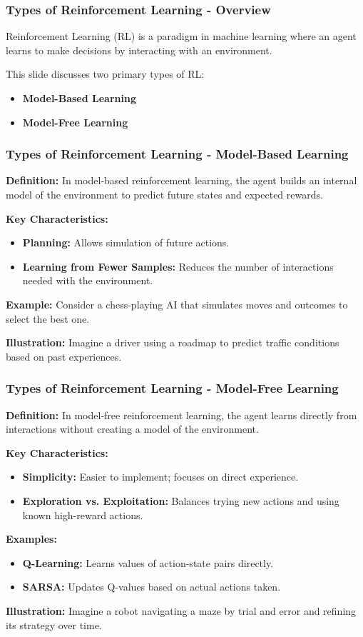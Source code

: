 \documentclass[aspectratio=169]{beamer}
\begin{document}
\begin{frame}[fragile]
  \frametitle{Types of Reinforcement Learning - Overview}
  Reinforcement Learning (RL) is a paradigm in machine learning where an agent learns to make decisions by interacting with an environment.
  
  This slide discusses two primary types of RL:
  \begin{itemize}
      \item \textbf{Model-Based Learning}
      \item \textbf{Model-Free Learning}
  \end{itemize}
\end{frame}

\begin{frame}[fragile]
  \frametitle{Types of Reinforcement Learning - Model-Based Learning}
  
  \textbf{Definition:}
  In model-based reinforcement learning, the agent builds an internal model of the environment to predict future states and expected rewards.
  
  \textbf{Key Characteristics:}
  \begin{itemize}
      \item \textbf{Planning:} Allows simulation of future actions.
      \item \textbf{Learning from Fewer Samples:} Reduces the number of interactions needed with the environment.
  \end{itemize}
  
  \textbf{Example:}
  Consider a chess-playing AI that simulates moves and outcomes to select the best one.
  
  \textbf{Illustration:}
  Imagine a driver using a roadmap to predict traffic conditions based on past experiences.
\end{frame}

\begin{frame}[fragile]
  \frametitle{Types of Reinforcement Learning - Model-Free Learning}

  \textbf{Definition:}
  In model-free reinforcement learning, the agent learns directly from interactions without creating a model of the environment.
  
  \textbf{Key Characteristics:}
  \begin{itemize}
      \item \textbf{Simplicity:} Easier to implement; focuses on direct experience.
      \item \textbf{Exploration vs. Exploitation:} Balances trying new actions and using known high-reward actions.
  \end{itemize}

  \textbf{Examples:}
  \begin{itemize}
      \item \textbf{Q-Learning:} Learns values of action-state pairs directly.
      \item \textbf{SARSA:} Updates Q-values based on actual actions taken.
  \end{itemize}

  \textbf{Illustration:}
  Imagine a robot navigating a maze by trial and error and refining its strategy over time.
\end{frame}
\end{document}
